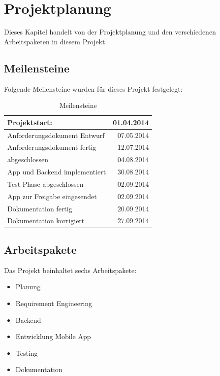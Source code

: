 %
%

\chapter{Projektplanung}\label{chap.projektplanung}
Dieses Kapitel handelt von der Projektplanung und den verschiedenen Arbeitspaketen in diesem Projekt.

\section{Meilensteine}\label{meilensteine}
Folgende Meilensteine wurden für dieses Projekt festgelegt:

\begin{table}[ht]
\centering
  \begin{tabular}{ l | r }
	\hline
	\rowcolor{gray}
	Projektstart:					&	01.04.2014	\\ \hline
	Anforderungsdokument Entwurf		&	07.05.2014	\\ \hline
	Anforderungsdokument fertig		&	12.07.2014	\\ \hline
	\glossarmark{Refactoring} abgeschlossen		&	04.08.2014	\\ \hline
	App und Backend implementiert		& 	30.08.2014	\\ \hline
	Test-Phase abgeschlossen			&	02.09.2014	\\ \hline
	App zur Freigabe eingesendet		&	02.09.2014	\\ \hline
	Dokumentation fertig			&	20.09.2014	\\ \hline
	Dokumentation korrigiert			&	27.09.2014	\\ \hline
  \end{tabular}
   \caption{Meilensteine}\label{table:milestones}
\end{table}

\section{Arbeitspakete}\label{arbeitspakete}
Das Projekt beinhaltet sechs Arbeitspakete:
\begin{itemize}
\item Planung
\item Requirement Engineering
\item {} Backend
\item Entwicklung Mobile App
\item Testing
\item Dokumentation
\end{itemize}

